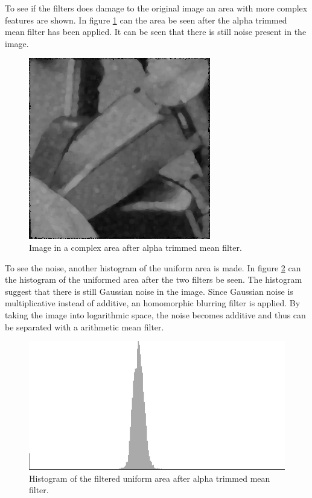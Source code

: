 To see if the filters does damage to the original image an area with more complex features are shown.
In figure \ref{fig:complex1_after_alpha} can the area be seen after the alpha trimmed mean filter has been applied.
It can be seen that there is still noise present in the image.

\begin{figure}[H]
\centering
\includegraphics[width = 0.8 \linewidth]{graphics/complex1_step2.png}
\caption{Image in a complex area after alpha trimmed mean filter.}
\label{fig:complex1_after_alpha}
\end{figure}

To see the noise, another histogram of the uniform area is made.
In figure \ref{fig:hist_img1_after_alpha} can the histogram of the uniformed area after the two filters be seen.
The histogram suggest that there is still Gaussian noise in the image.
Since Gaussian noise is multiplicative instead of additive, an homomorphic blurring filter is applied.
By taking the image into logarithmic space, the noise becomes additive and thus can be separated with a arithmetic mean filter.

\begin{figure}[H]
\centering
\includegraphics[width = 0.8 \linewidth]{graphics/hist1_uniform2.png}
\caption{Histogram of the filtered uniform area after alpha trimmed mean filter.}
\label{fig:hist_img1_after_alpha}
\end{figure}

